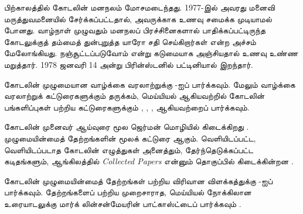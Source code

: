 \documentclass[../../../include/open-logic-section]{subfiles}
\begin{document}
பிற்காலத்தில் கோடலின் மனநலம் மோசமடைந்தது. 1977-இல் அவரது மனைவி
மருத்துவமனையில் சேர்க்கப்பட்டதால், அவருக்காக உணவு சமைக்க முடியாமல்
போனது. வாழ்நாள் முழுவதும் மனநலப் பிரச்சினைகளால் பாதிக்கப்பட்டிருந்த
கோடலுக்குத் தம்மைத் துன்புறுத்த யாரோ சதி செய்கிறார்கள் என்ற அச்சம்
மேலோங்கியது. நஞ்சூட்டப்படுவோம் என்று கடுமையாக அஞ்சியதால் உணவு உண்ண
மறுத்தார். 1978 ஜனவரி 14 அன்று பிரின்ஸ்டனில் பட்டினியால் இறந்தார்.

\begin{reading}
கோடலின் முழுமையான வாழ்க்கை வரலாற்றுக்கு \citet{Dawson1997}-ஐப்
பார்க்கவும். மேலும் வாழ்க்கை வரலாற்றுக் கட்டுரைகளுக்கும் தருக்கம்,
மெய்யியல் ஆகியவற்றில் கோடலின் பங்களிப்புகள் பற்றிய கட்டுரைகளுக்கும்
\citet{Wang1990}, \citet{Baaz2011}, \citet{Takeuti2003},
\citet{Sigmund2007} ஆகியவற்றைப் பார்க்கவும்.

கோடலின் முனைவர் ஆய்வுரை மூல ஜெர்மன் மொழியில் கிடைக்கிறது
\citep{Godel1929}. முழுமையின்மைத் தேற்றங்களின் மூலக் கட்டுரை
\citep{Godel1931} ஆகும். வெளியிடப்பட்ட, வெளியிடப்படாத கோடலின்
எழுத்துகள் அனைத்தும், தேர்ந்தெடுக்கப்பட்ட கடிதங்களும், ஆங்கிலத்தில்
\emph{Collected Papers} என்னும் தொகுப்பில் கிடைக்கின்றன
\citet{Godel1986,Godel1990}.

கோடலின் முழுமையின்மைத் தேற்றங்கள் பற்றிய விரிவான விளக்கத்துக்கு
\citet{Smith2013}-ஐப் பார்க்கவும். தேற்றங்களைப் பற்றிய முறைசாராத,
மெய்யியல் நோக்கிலான உரையாடலுக்கு மார்க் லின்சன்மேயரின் பாட்காஸ்ட்டைப்
பார்க்கவும் \citep{Linsenmayer2014}.
\end{reading}
\end{document}
